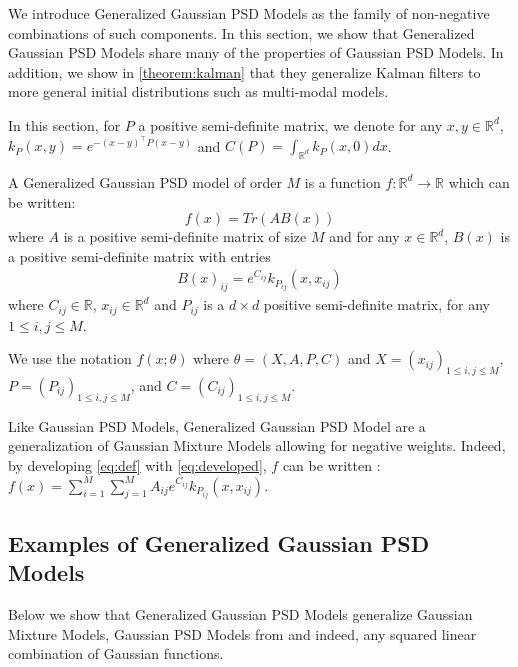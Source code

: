 We introduce Generalized Gaussian PSD Models as the family of non-negative combinations of such components. In this section, we show that Generalized Gaussian PSD Models share many of the properties of Gaussian PSD Models. In addition, we show in \cref{theorem:kalman} that they generalize Kalman filters to more general initial distributions such as multi-modal models.

In this section, for $P$ a positive semi-definite matrix, we denote for any $x, y\in\mathbb R^d$, $k_P(x, y) = e^{-(x-y)^\top  P(x-y)}$ and $C(P) = \int_{\mathbb R^d} k_P(x, 0)dx$.

\begin{definition}\label{definition:ggpsd}
A Generalized Gaussian PSD model of order $M$ is a function $f: \mathbb R^d \to\mathbb R$ which can be written:
\begin{equation}\label{eq:def}
    f(x) = Tr(AB(x))%
\end{equation}
where $A$ is a positive semi-definite matrix of size $M$ and for any $x\in\mathbb R^d$, $B(x)$ is a positive semi-definite matrix with entries
\begin{align}\label{eq:developed}
    B(x)_{ij}=e^{C_{ij}}k_{P_{ij}}(x, x_{ij})
\end{align}
where $C_{ij} \in \mathbb R$, $x_{ij}\in\mathbb R^d$ and $P_{ij}$ is a $d\times d$ positive semi-definite matrix, for any $1\leq i,j\leq M$.
\end{definition}
We use the notation $f(x; \theta)$ where $\theta = (X, A, P, C)$ and $X = (x_{ij})_{1 \leq i,j\leq M}$, $P=(P_{ij})_{1 \leq i,j\leq M}$, and $C=(C_{ij})_{1 \leq i,j\leq M}$.

Like Gaussian PSD Models, Generalized Gaussian PSD Model are a generalization of Gaussian Mixture Models allowing for negative weights. Indeed, by developing \cref{eq:def} with \cref{eq:developed}, $f$ can be written :  $f(x) = \sum_{i=1}^M\sum_{j=1}^M A_{ij}e^{C_{ij}}k_{P_{ij}}(x, x_{ij})$.

\subsection{Examples of Generalized Gaussian PSD Models}
Below we show that Generalized Gaussian PSD Models generalize Gaussian Mixture Models, Gaussian PSD Models from \cite{ciliberto2021} and indeed, any squared linear combination of Gaussian functions.

